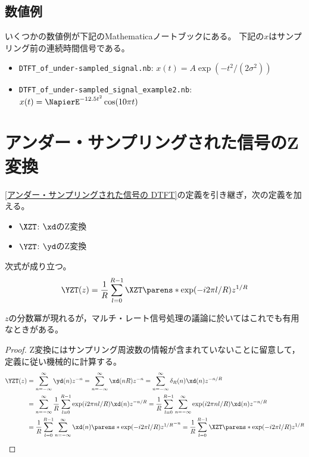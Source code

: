         \subsection{数値例}
            いくつかの数値例が下記のMathematicaノートブックにある。
            下記の$x$はサンプリング前の連続時間信号である。
            \begin{itemize}
                \item \verb|DTFT_of_under-sampled_signal.nb|: $x(t) = A\exp(-t^2/(2\sigma^2))$
                \item \verb|DTFT_of_under-sampled_signal_example2.nb|: $x(t) = \NapierE^{-12.5 t^2}\cos(10\pi t)$
            \end{itemize}
    \section{アンダー・サンプリングされた信号のZ変換}
        \ref{アンダー・サンプリングされた信号の DTFT}の定義を引き継ぎ，次の定義を加える。
        \begin{itemize}
            \item $\XZT$: $\xd$のZ変換
            \item $\YZT$: $\yd$のZ変換
        \end{itemize}
        \begin{shadebox}
            次式が成り立つ。
            \[ \YZT(z) = \frac{1}{R}\sum_{l=0}^{R-1} \XZT\parens*{\exp(-i2\pi l/R)z^{1/R}} \]
        \end{shadebox}
        $z$の分数冪が現れるが，マルチ・レート信号処理の議論に於いてはこれでも有用なときがある。
        \begin{proof}
            Z変換にはサンプリング周波数の情報が含まれていないことに留意して，定義に従い機械的に計算する。
            \begin{align*}
                \YZT(z) &= \sum_{n=-\infty}^\infty \yd(n)z^{-n} = \sum_{n=-\infty}^\infty \xd(nR)z^{-n} = \sum_{n=-\infty}^\infty \delta_R(n)\xd(n)z^{-n/R} \\
                &= \sum_{n=-\infty}^\infty \frac{1}{R}\sum_{l=0}^{R-1}\exp(i2\pi nl/R)\xd(n)z^{-n/R} = \frac{1}{R}\sum_{l=0}^{R-1}\sum_{n=-\infty}^\infty \exp(i2\pi nl/R)\xd(n)z^{-n/R} \\
                &= \frac{1}{R}\sum_{l=0}^{R-1}\sum_{n=-\infty}^\infty \xd(n)\parens*{\exp(-i2\pi l/R)z^{1/R}}^{-n} = \frac{1}{R}\sum_{l=0}^{R-1} \XZT\parens*{\exp(-i2\pi l/R)z^{1/R}}
            \end{align*}
        \end{proof}
